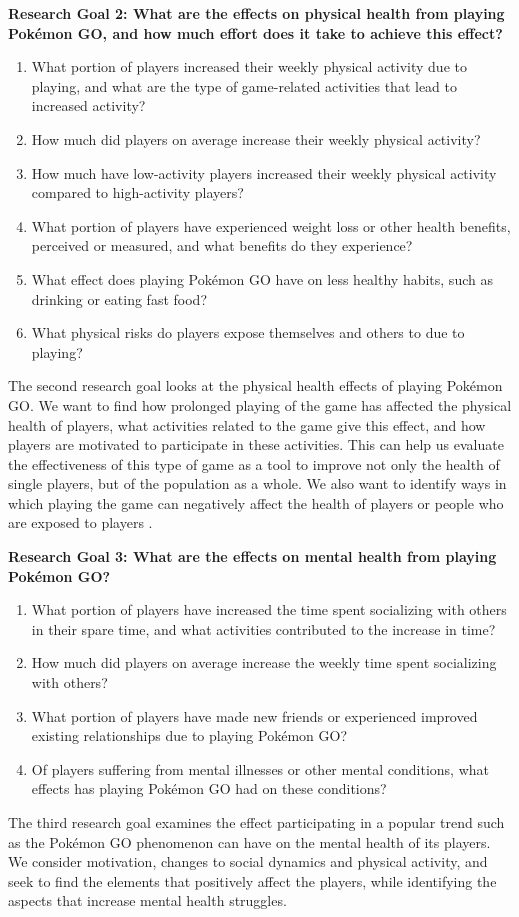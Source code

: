 \textbf{Research Goal 2: What are the effects on physical health from playing Pokémon GO, and how much effort does it take to achieve this effect?}

\begin{enumerate}
	\item What portion of players increased their weekly physical activity due to playing, and what are the type of game-related activities that lead to increased activity?
	\item How much did players on average increase their weekly physical activity?
	\item How much have low-activity players increased their weekly physical activity compared to high-activity players?
	\item What portion of players have experienced weight loss or other health benefits, perceived or measured, and what benefits do they experience?
	\item What effect does playing Pokémon GO have on less healthy  habits, such as drinking or eating fast food?
	\item What physical risks do players expose themselves and others to due to playing?
\end{enumerate}

The second research goal looks at the physical health effects of playing Pokémon GO. We want to find how prolonged playing of the game has affected the physical health of players, what activities related to the game give this effect, and how players are motivated to participate in these activities. This can help us evaluate the effectiveness of this type of game as a tool to improve not only the health of single players, but of the population as a whole. We also want to identify ways in which playing the game can negatively affect the health of players or people who are exposed to players .

\textbf{Research Goal 3: What are the effects on mental health from playing Pokémon GO?}

\begin{enumerate}
	\item What portion of players have increased the time spent socializing with others in their spare time, and what activities contributed to the increase in time?
	\item How much did players on average increase the weekly time spent socializing with others?
	\item What portion of players have made new friends or experienced improved existing relationships due to playing Pokémon GO?
	\item Of players suffering from mental illnesses or other mental conditions, what effects has playing Pokémon GO had on these conditions?
\end{enumerate}

The third research goal examines the effect participating in a popular trend such as the Pokémon GO phenomenon can have on the mental health of its players. We consider motivation, changes to social dynamics and physical activity, and seek to find the elements that positively affect the players, while identifying the aspects that increase mental health struggles.